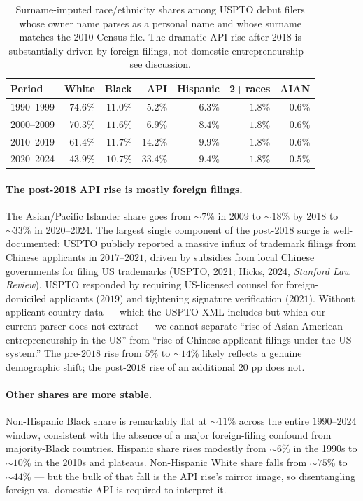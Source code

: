 \documentclass[11pt]{article}
\begin{document}
\begin{table}[h]
\centering
\small
\begin{tabular}{lrrrrrr}
\toprule
Period & White & Black & API & Hispanic & 2+\,races & AIAN \\
\midrule
1990--1999 & $74.6\%$ & $11.0\%$ & $5.2\%$  & $6.3\%$  & $1.8\%$ & $0.6\%$ \\
2000--2009 & $70.3\%$ & $11.6\%$ & $6.9\%$  & $8.4\%$  & $1.8\%$ & $0.6\%$ \\
2010--2019 & $61.4\%$ & $11.7\%$ & $14.2\%$ & $9.9\%$  & $1.8\%$ & $0.6\%$ \\
2020--2024 & $43.9\%$ & $10.7\%$ & $33.4\%$ & $9.4\%$  & $1.8\%$ & $0.5\%$ \\
\bottomrule
\end{tabular}
\caption{Surname-imputed race/ethnicity shares among USPTO debut
filers whose owner name parses as a personal name and whose surname
matches the 2010 Census file. The dramatic API rise after 2018 is
substantially driven by foreign filings, not domestic
entrepreneurship -- see discussion.}
\label{tab:surname}
\end{table}

\paragraph{The post-2018 API rise is mostly foreign filings.} The
Asian/Pacific Islander share goes from $\sim 7\%$ in 2009 to $\sim 18\%$
by 2018 to $\sim 33\%$ in 2020--2024. The largest single component of
the post-2018 surge is well-documented: USPTO publicly reported a
massive influx of trademark filings from Chinese applicants in
$2017$--$2021$, driven by subsidies from local Chinese governments
for filing US trademarks (USPTO, 2021; Hicks, 2024, \emph{Stanford
Law Review}). USPTO responded by requiring US-licensed counsel for
foreign-domiciled applicants ($2019$) and tightening signature
verification ($2021$). Without applicant-country data --- which the
USPTO XML includes but which our current parser does not extract ---
we cannot separate ``rise of Asian-American entrepreneurship in the
US'' from ``rise of Chinese-applicant filings under the US system.''
The pre-$2018$ rise from $5\%$ to $\sim 14\%$ likely reflects a
genuine demographic shift; the post-$2018$ rise of an additional
$20$ pp does not.

\paragraph{Other shares are more stable.} Non-Hispanic Black share
is remarkably flat at $\sim 11\%$ across the entire $1990$--$2024$
window, consistent with the absence of a major foreign-filing
confound from majority-Black countries. Hispanic share rises modestly
from $\sim 6\%$ in the 1990s to $\sim 10\%$ in the 2010s and plateaus.
Non-Hispanic White share falls from $\sim 75\%$ to $\sim 44\%$ --- but
the bulk of that fall is the API rise's mirror image, so
disentangling foreign vs.\ domestic API is required to interpret it.
\end{document}
